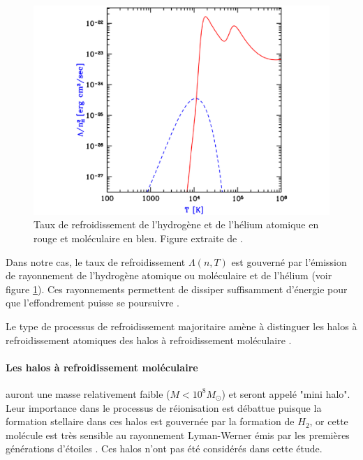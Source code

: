 \begin{figure}
        \includegraphics[width=.95\linewidth]{img/01/fonction_refroidissement.pdf} 
        \caption[Fonction de refroidissement]{Taux de refroidissement de l'hydrogène et de l'hélium atomique en rouge et moléculaire en bleu. 
        Figure extraite de \cite{2016PhR...645....1B}.
 		\label{fig:refroidissement}}
\end{figure}

Dans notre cas, le taux de refroidissement $\Lambda(n,T)$ est gouverné par l'émission de rayonnement de l'hydrogène atomique ou moléculaire et de l’hélium (voir figure \ref{fig:refroidissement}).
Ces rayonnements permettent de dissiper suffisamment d'énergie pour que l'effondrement puisse se poursuivre \citep{2001PhR...349..125B}.

Le type de processus de refroidissement majoritaire amène à distinguer les halos à refroidissement atomiques des halos à refroidissement moléculaire \citep{2002Sci...295...93A}.

\paragraph{Les halos à refroidissement moléculaire} auront une masse relativement faible ($M < 10^8 M_\odot$) et seront appelé "mini halo".
Leur importance dans le processus de réionisation est débattue \citep{2012ApJ...756L..16A} puisque la formation stellaire dans ces halos est gouvernée par la formation de $H_2$, or cette molécule est très sensible au rayonnement Lyman-Werner émis par les premières générations d'étoiles \citep{2002ApJ...575...49R}.
Ces halos n'ont pas été considérés dans cette étude.

